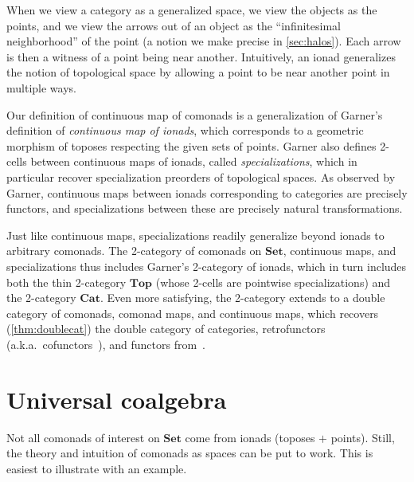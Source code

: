 \documentclass[11pt, oneside, article]{memoir}
\theoremstyle{plain}
\theoremstyle{definition}
\theoremstyle{remark}
\newcommand{\namedcat}[1]{\mathbf{#1}}
\newcommand{\Set}{\namedcat{Set}}
\newcommand{\Cat}{\namedcat{Cat}}
\renewcommand{\Top}{\namedcat{Top}}
\begin{document}
When we view a category as a generalized space, we view the objects as
the points, and we view the arrows out of an object as the
``infinitesimal neighborhood'' of the point (a notion we make precise
in \cref{sec:halos}). Each arrow is then a witness of a point being
near another. Intuitively, an ionad generalizes the notion of
topological space by allowing a point to be near another point in
multiple ways.

Our definition of continuous map of comonads is a generalization of
Garner's definition of \emph{continuous map of ionads}, which
corresponds to a geometric morphism of toposes respecting the given
sets of points. Garner also defines 2-cells between continuous maps of
ionads, called \emph{specializations}, which in particular recover
specialization preorders of topological spaces. As observed by Garner,
continuous maps between ionads corresponding to categories are
precisely functors, and specializations between these are precisely
natural transformations.

Just like continuous maps, specializations readily generalize beyond
ionads to arbitrary comonads. The 2-category of comonads on $\Set$,
continuous maps, and specializations thus includes Garner's 2-category
of ionads, which in turn includes both the thin 2-category $\Top$
(whose 2-cells are pointwise specializations) and the 2-category
$\Cat$. Even more satisfying, the 2-category extends to a double
category of comonads, comonad maps, and continuous maps, which
recovers (\cref{thm:doublecat}) the double category of categories,
retrofunctors (a.k.a.\
cofunctors~\cite{higgins-mackenzie,aguiar,dimeglio:lenses,ahman-uustalu:updates,niu-spivak}),
and functors from~\cite{clarke-dimeglio}.

\section*{Universal coalgebra}

Not all comonads of interest on $\Set$ come from ionads (toposes $+$
points). Still, the theory and intuition of comonads as spaces can be
put to work. This is easiest to illustrate with an example.
\end{document}
